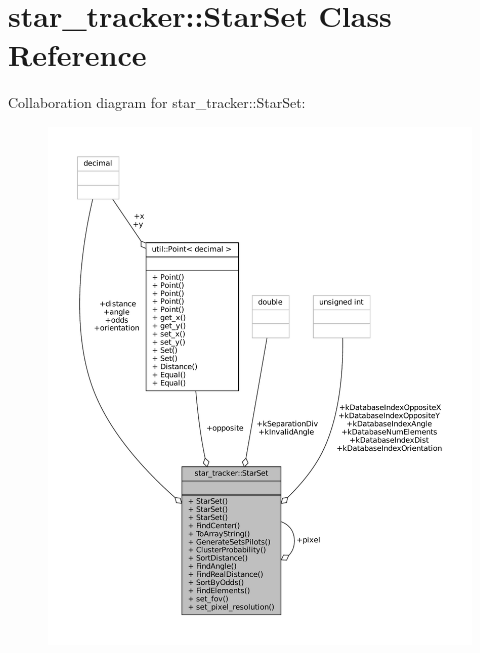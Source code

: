 \hypertarget{classstar__tracker_1_1StarSet}{}\section{star\+\_\+tracker\+:\+:Star\+Set Class Reference}
\label{classstar__tracker_1_1StarSet}


Collaboration diagram for star\+\_\+tracker\+:\+:Star\+Set\+:
\nopagebreak
\begin{figure}[H]
\begin{center}
\leavevmode
\includegraphics[width=350pt]{classstar__tracker_1_1StarSet__coll__graph}
\end{center}
\end{figure}
